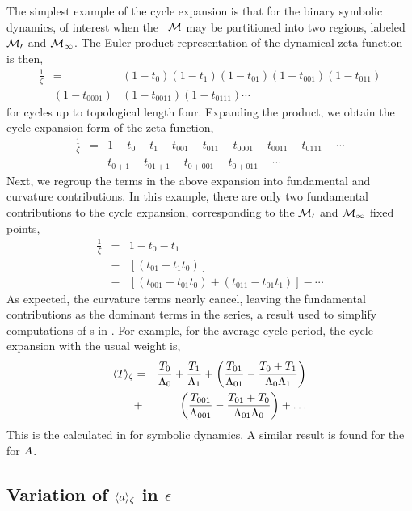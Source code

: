 \documentclass[aps,pre,
                showpacs,
                twocolumn,
                groupedaddress,
                superscriptaddress,
                floatfix]{revtex4-1}
\begin{document}
The simplest example of the cycle expansion is that for the binary
symbolic dynamics, of interest when the \statesp\ $\cal M$ may be partitioned
into two regions, labeled $\cal M_{0}$ and $\cal M_{1}$. The Euler product
representation of the dynamical zeta function is then,
\begin{eqnarray*}
\frac{1}{\zeta} &=& (1 - t_{0})(1-t_{1})(1-t_{01})(1-t_{001})(1-t_{011})
\\ &(1-t_{0001})&(1-t_{0011})(1-t_{0111})\cdots
\end{eqnarray*}
for cycles up to topological length four. Expanding the product, we
obtain the cycle expansion form of the zeta function,
\begin{eqnarray*}
\frac{1}{\zeta}
&=& 1 - t_{0} - t_{1} - t_{001} - t_{011} - t_{0001} - t_{0011} - t_{0111} - \cdots
\\
&-& t_{0+1} - t_{01+1} - t_{0+001} - t_{0+011} - \cdots
\end{eqnarray*}
Next, we regroup the terms in the above expansion into fundamental and
curvature contributions. In this example, there are only two fundamental
contributions to the cycle expansion, corresponding to the $\cal M_{0}$ and
$\cal M_{1}$ fixed points,
\begin{eqnarray*}
\frac{1}{\zeta} &=& 1 - t_{0} - t_{1} \\
&-& [(t_{01} - t_{1}t_{0})] \\
&-& [(t_{001} - t_{01}t_{0}) + (t_{011} - t_{01}t_{1})] - \cdots
\end{eqnarray*}
As expected, the curvature terms nearly cancel, leaving the fundamental
contributions as the dominant terms in the series, a result used to
simplify computations of {\cycForm s} in . For example,
for the average cycle period, the cycle expansion with the usual weight
is,
\begin{eqnarray*}
\langle {{\ensuremath{T_{}}}} \rangle_{\zeta}
&=& \frac{T_{0}}{\Lambda_{0}} + \frac{T_{1}}{\Lambda_{1}}
+   \left( \frac{T_{01}}{\Lambda_{01}}-\frac{T_{0} + T_{1}}{\Lambda_{0}\Lambda_{1}}\right)
\\
&+& \left( \frac{T_{001}}{\Lambda_{001}}-\frac{T_{01} + T_{0}}{\Lambda_{01}\Lambda_{0}}\right)
+\dots
\end{eqnarray*}
This is the {\cycForm} calculated in 
for symbolic dynamics. A similar result is found for the {\cycForm} for $A$.

\subsection{Variation of $\langle {\ensuremath{a}} \rangle_{\zeta}$ in $\epsilon$}
\label{sect:VarObsEps}
\end{document}
